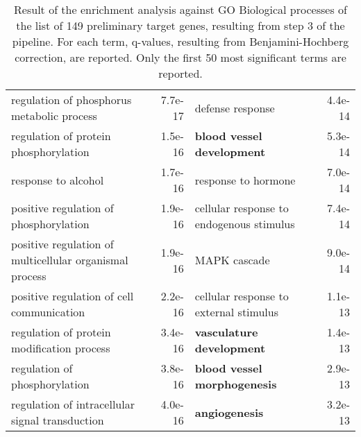\documentclass[fleqn,10pt]{SelfArx} %
\begin{document}
\begin{table}[!ht]
\begin{tabularx}{\textwidth}{lRlR}
		regulation of phosphorus metabolic process & 7.7e-17 & defense response & 4.4e-14 \\ 
		regulation of protein phosphorylation & 1.5e-16 & \textbf{blood vessel development} & 5.3e-14 \\ 
		response to alcohol & 1.7e-16 & response to hormone & 7.0e-14 \\ 
		positive regulation of phosphorylation & 1.9e-16 & cellular response to endogenous stimulus & 7.4e-14 \\ 
		positive regulation of multicellular organismal process & 1.9e-16 & MAPK cascade & 9.0e-14 \\ 
		positive regulation of cell communication & 2.2e-16 & cellular response to external stimulus & 1.1e-13 \\ 
		regulation of protein modification process & 3.4e-16 & \textbf{vasculature development} & 1.4e-13 \\ 
		regulation of phosphorylation & 3.8e-16 & \textbf{blood vessel morphogenesis} & 2.9e-13 \\ 
		regulation of intracellular signal transduction & 4.0e-16 & \textbf{angiogenesis} & 3.2e-13 \\
	\end{tabularx}
	\smallskip
	\caption{Result of the enrichment analysis against GO Biological processes of the list of 149 preliminary target genes, resulting from step 3 of the pipeline. For each term, q-values, resulting from Benjamini-Hochberg correction, are reported. Only the first 50 most significant terms are reported.}
	\label{tab:bp149}
\end{table}
\end{document}
